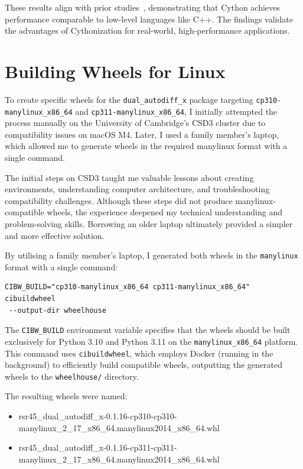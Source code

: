 \documentclass[a4paper,12pt]{article}
\begin{document}
These results align with prior studies~\cite{mortensen2016cython}, demonstrating that Cython achieves performance comparable to low-level languages like C++. The findings validate the advantages of Cythonization for real-world, high-performance applications.


\section{Building Wheels for Linux}

To create specific wheels for the \texttt{dual\_autodiff\_x} package targeting \texttt{cp310-manylinux\_x86\_64} and \texttt{cp311-manylinux\_x86\_64}, I initially attempted the process manually on the University of Cambridge's CSD3 cluster due to compatibility issues on macOS M4. Later, I used a family member's laptop, which allowed me to generate wheels in the required manylinux format with a single command.

The initial steps on CSD3 taught me valuable lessons about creating environments, understanding computer architecture, and troubleshooting compatibility challenges. Although these steps did not produce manylinux-compatible wheels, the experience deepened my technical understanding and problem-solving skills. Borrowing an older laptop ultimately provided a simpler and more effective solution.


By utilising a family member's laptop, I generated both wheels in the \texttt{manylinux} format with a single command:
\begin{verbatim}
CIBW_BUILD="cp310-manylinux_x86_64 cp311-manylinux_x86_64" cibuildwheel
 --output-dir wheelhouse
\end{verbatim}
The \texttt{CIBW\_BUILD} environment variable specifies that the wheels should be built exclusively for Python 3.10 and Python 3.11 on the \texttt{manylinux\_x86\_64} platform. This command uses \texttt{cibuildwheel}, which employs Docker (running in the background) to efficiently build compatible wheels, outputting the generated wheels to the \texttt{wheelhouse/} directory.

The resulting wheels were named:
\begin{itemize}
    \item rsr45\_dual\_autodiff\_x-0.1.16-cp310-cp310-manylinux\_2\_17\_x86\_64.manylinux2014\_x86\_64.whl
    \item rsr45\_dual\_autodiff\_x-0.1.16-cp311-cp311-manylinux\_2\_17\_x86\_64.manylinux2014\_x86\_64.whl
\end{itemize}
\end{document}
